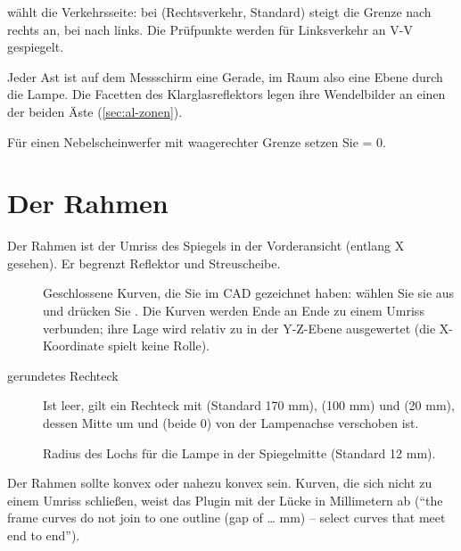  wählt die Verkehrsseite: bei  (Rechtsverkehr, Standard) steigt die
Grenze nach rechts an, bei  nach links. Die Prüfpunkte werden für Linksverkehr an
V-V gespiegelt.

Jeder Ast ist auf dem Messschirm eine Gerade, im Raum also eine Ebene durch die Lampe. Die
Facetten des Klarglasreflektors legen ihre Wendelbilder an einen der beiden Äste
(\autoref{sec:al-zonen}).

\begin{tipp}
Für einen Nebelscheinwerfer mit waagerechter Grenze setzen Sie  = 0.
\end{tipp}

\section{Der Rahmen}\label{sec:al-rahmen}

Der Rahmen ist der Umriss des Spiegels in der Vorderansicht (entlang X gesehen). Er begrenzt
Reflektor und Streuscheibe.

\begin{description}
  \item[] Geschlossene Kurven, die Sie im CAD gezeichnet haben: wählen Sie sie
    aus und drücken Sie . Die Kurven werden Ende an Ende zu einem Umriss verbunden;
    ihre Lage wird relativ zu  in der Y-Z-Ebene ausgewertet (die X-Koordinate
    spielt keine Rolle).
  \item[gerundetes Rechteck] Ist  leer, gilt ein Rechteck mit 
    (Standard 170 mm),  (100 mm) und  (20 mm), dessen Mitte um
     und  (beide 0) von der
    Lampenachse verschoben ist.
  \item[] Radius des Lochs für die Lampe in der Spiegelmitte (Standard 12 mm).
\end{description}

\begin{hinweis}
Der Rahmen sollte konvex oder nahezu konvex sein. Kurven, die sich nicht zu einem Umriss schließen,
weist das Plugin mit der Lücke in Millimetern ab (\enquote{the frame curves do not join to one outline
(gap of … mm) – select curves that meet end to end}).
\end{hinweis}

